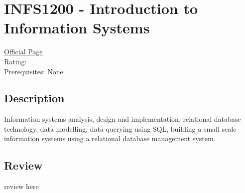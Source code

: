 \hypertarget{INFS1200}{\section{INFS1200 - Introduction to Information Systems}}

\large
\textcolor{turbo_purple}{\href{https://my.uq.edu.au/programs-courses/course.html?course_code=INFS1200}{Official Page}} \\
Rating: \cstar\cstar\cstar\cstar\ostar \\
Prerequisites: None

\normalsize
\subsection*{Description}
Information systems analysis, design and implementation, relational database technology, data modelling, data querying using SQL, building a small scale information systems using a relational database management system.

\subsection*{Review}
review here
